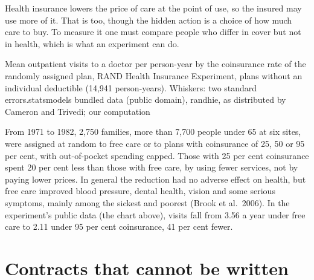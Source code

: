 Health insurance lowers the price of care at the point of use, so the insured may use more of it. That is 
too, though the hidden action is a choice of how much care to buy. To measure it one must compare people who differ in
cover but not in health, which is what an experiment can do.

\begin{omchart}{Mean outpatient visits to a doctor per person-year by the coinsurance rate of the randomly assigned
  plan, RAND Health Insurance Experiment, plans without an individual deductible (14{,}941 person-years). Whiskers: two
  standard errors.}{statsmodels bundled data (public domain), randhie, as distributed by Cameron and Trivedi; our
  computation}
\end{omchart}

\begin{record}
From 1971 to 1982, 2{,}750 families, more than 7{,}700 people under 65 at six sites, were assigned at random to free care or
to plans with coinsurance of 25, 50 or 95 per cent, with out-of-pocket spending capped. Those with 25 per cent coinsurance
spent 20 per cent less than those with free care, by using fewer services, not by paying lower prices. In general the
reduction had no adverse effect on health, but free care improved blood pressure, dental health, vision and some serious
symptoms, mainly among the sickest and poorest (Brook et al.\ 2006). In the experiment's public data
(the chart above), visits fall from 3.56 a year under free care to 2.11 under 95 per cent coinsurance, 41 per cent
fewer.
\end{record}

\section{Contracts that cannot be written}\label{sec:b2:moral-hazard:incomplete}

